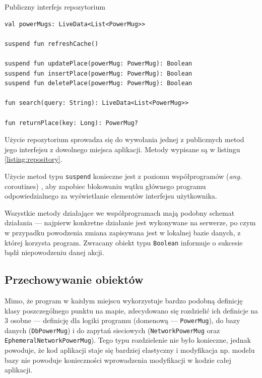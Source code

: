 \documentclass[polish,polish,a4paper,12pt]{article}
\begin{document}
	\begin{listing}[H]
		\caption{Publiczny interfejs repozytorium}
		\begin{verbatim}
val powerMugs: LiveData<List<PowerMug>>

suspend fun refreshCache()

suspend fun updatePlace(powerMug: PowerMug): Boolean
suspend fun insertPlace(powerMug: PowerMug): Boolean
suspend fun deletePlace(powerMug: PowerMug): Boolean

fun search(query: String): LiveData<List<PowerMug>>

fun returnPlace(key: Long): PowerMug?
		\end{verbatim}
		\label{listing:repository}
	\end{listing}

	Użycie repozytorium sprowadza się do wywołania jednej z publicznych metod jego interfejsu z dowolnego miejsca aplikacji. Metody wypisane są w listingu \ref{listing:repository}.

	Użycie metod typu \texttt{suspend} konieczne jest z poziomu współprogramów (\textit{ang.} coroutines) \cite{kotlindocs}, aby zapobiec blokowaniu wątku głównego programu odpowiedzialnego za wyświetlanie elementów interfejsu użytkownika.

	Wszystkie metody działające we współprogramach mają podobny schemat działania — najpierw konkretne działanie jest wykonywane na serwerze, po czym w przypadku powodzenia zmiana zapisywana jest w lokalnej bazie danych, z której korzysta program. Zwracany obiekt typu \texttt{Boolean} informuje o sukcesie bądź niepowodzeniu danej akcji.

	\subsection{Przechowywanie obiektów}

	Mimo, że program w każdym miejscu wykorzystuje bardzo podobną definicję klasy poszczególnego punktu na mapie, zdecydowano się rozdzielić ich definicje na 3 osobne — definicję dla logiki programu (domenową — \texttt{PowerMug}), do bazy danych (\texttt{DbPowerMug}) i do zapytań sieciowych (\texttt{NetworkPowerMug} oraz \texttt{EphemeralNetworkPowerMug}). Tego typu rozdzielenie nie było konieczne, jednak powoduje, że kod aplikacji staje się bardziej elastyczny i modyfikacja np. modelu bazy nie powoduje konieczności wprowadzenia modyfikacji w kodzie całej aplikacji.
\end{document}
